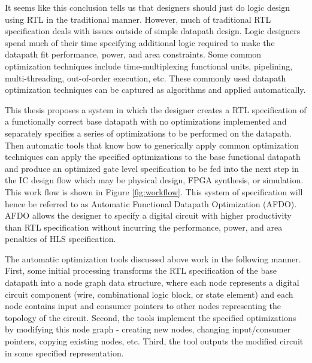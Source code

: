 It seems like this conclusion tells us that designers should just do logic design using RTL in the traditional manner. However, much of traditional RTL specification deals with issues outside of simple datapath design. Logic designers spend much of their time specifying additional logic required to make the datapath fit performance, power, and area constraints. Some common optimization techniques include time-multiplexing functional units, pipelining, multi-threading, out-of-order execution, etc. These commonly used datapath optimization techniques can be captured as algorithms and applied automatically.

This thesis proposes a system in which the designer creates a RTL specification of a functionally correct base datapath with no optimizations implemented and separately specifies a series of optimizations to be performed on the datapath. Then automatic tools that know how to generically apply common optimization techniques can apply the specified optimizations to the base functional datapath and produce an optimized gate level specification to be fed into the next step in the IC design flow which may be physical design, FPGA synthesis, or simulation. This work flow is shown in Figure \ref{fig:workflow}. This system of specification will hence be referred to as Automatic Functional Datapath Optimization (AFDO). AFDO allows the designer to specify a digital circuit with higher productivity than RTL specification without incurring the performance, power, and area penalties of HLS specification.

The automatic optimization tools discussed above work in the following manner. First, some initial processing transforms the RTL specification of the base datapath into a node graph data structure, where each node represents a digital circuit component (wire, combinational logic block, or state element) and each node contains input and consumer pointers to other nodes representing the topology of the circuit. Second, the tools implement the specified optimizations by modifying this node graph - creating new nodes, changing input/consumer pointers, copying existing nodes, etc. Third, the tool outputs the modified circuit in some specified representation.

